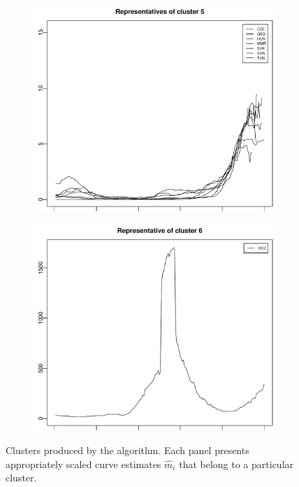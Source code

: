 \documentclass[a4paper,11pt]{article}
\numberwithin{equation}{section}
\begin{document}
\begin{figure}[t!]
\begin{subfigure}[b]{0.475\textwidth}
\caption{}\label{fig:cl4}
\end{subfigure}\\
\begin{subfigure}[b]{0.475\textwidth}
\includegraphics[width=\textwidth]{plots/results_cluster_5}
\caption{}\label{fig:cl5}
\end{subfigure}\hspace{0.25cm}
\begin{subfigure}[b]{0.475\textwidth}
\includegraphics[width=\textwidth]{plots/results_cluster_6}
\caption{}\label{fig:cl6}
\end{subfigure}
\caption{Clusters produced by the algorithm. Each panel presents appropriately scaled curve estimates $\widehat{m}_i$ that belong to a particular cluster.}\label{fig:clusters}
\end{figure}


\newpage

{\small
\setlength{\bibsep}{0.35em}
}
\end{document}
